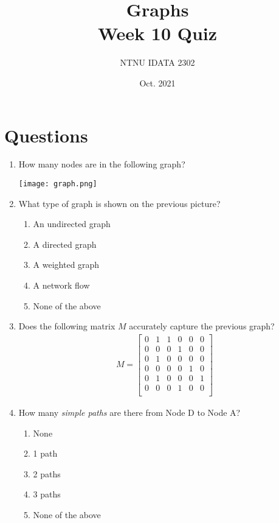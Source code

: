 \documentclass[11pt]{article}
\author{NTNU IDATA 2302}
\date{Oct. 2021}
\title{Graphs\\\medskip
\large Week 10 Quiz}
\begin{document}
\maketitle

\section{Questions}
\label{sec:org8e46919}

\begin{enumerate}
\item How many nodes are in the following graph?
\begin{center}
\texttt{[image: graph.png]}
\end{center}

\item What type of graph is shown on the previous picture?
\begin{enumerate}
\item An undirected graph
\item A directed graph
\item A weighted graph
\item A network flow
\item None of the above
\end{enumerate}

\item Does the following matrix \(M\) accurately capture the previous
graph?
\begin{align*}
     M =  \begin{bmatrix}
          0 & 1 & 1 & 0 & 0 & 0 \\
          0 & 0 & 0 & 1 & 0 & 0 \\
          0 & 1 & 0 & 0 & 0 & 0 \\
          0 & 0 & 0 & 0 & 1 & 0 \\
          0 & 1 & 0 & 0 & 0 & 1 \\
          0 & 0 & 0 & 1 & 0 & 0 \\
          \end{bmatrix}
\end{align*}

\item How many \emph{simple paths} are there from Node D to Node A?
\begin{enumerate}
\item None
\item 1 path
\item 2 paths
\item 3 paths
\item None of the above
\end{enumerate}


\end{enumerate}
\end{document}
